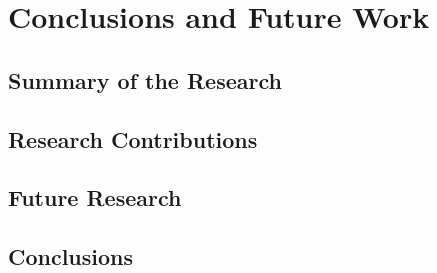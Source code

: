\chapter{Conclusions and Future Work\label{cha:conclusion}}

\section{Summary of the Research}

\section{Research Contributions}

\section{Future Research}

\section{Conclusions}
